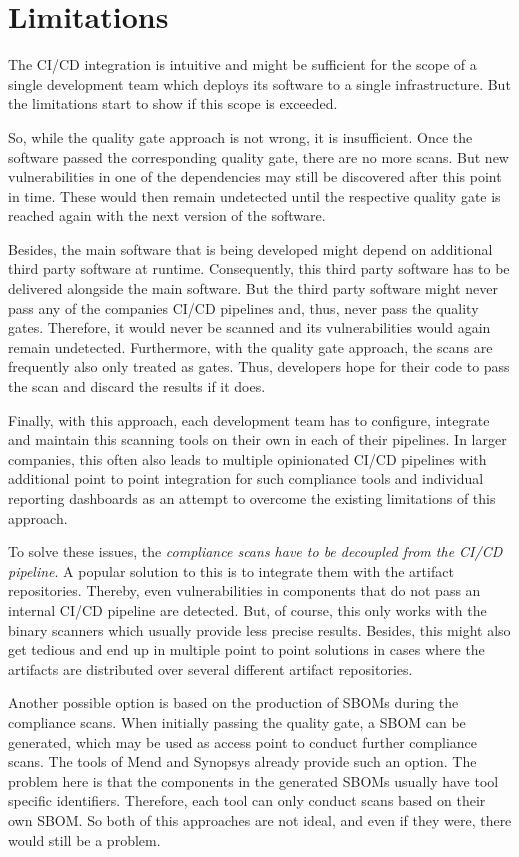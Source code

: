 \section{Limitations} \label{sec:Limitations}
The CI/CD integration is intuitive and might be sufficient for the scope of a single development team which deploys its software to a single infrastructure. But the limitations start to show if this scope is exceeded.\par
So, while the quality gate approach is not wrong, it is insufficient. Once the software passed the corresponding quality gate, there are no more scans. But new vulnerabilities in one of the dependencies may still be discovered after this point in time. These would then remain undetected until the respective quality gate is reached again with the next version of the software.\par
Besides, the main software that is being developed might depend on additional third party software at runtime. Consequently, this third party software has to be delivered alongside the main software. But the third party software might never pass any of the companies CI/CD pipelines and, thus, never pass the quality gates. Therefore, it would never be scanned and its vulnerabilities would again remain undetected. Furthermore, with the quality gate approach, the scans are frequently also only treated as gates. Thus, developers hope for their code to pass the scan and discard the results if it does.\par 
Finally, with this approach, each development team has to configure, integrate and maintain this scanning tools on their own in each of their pipelines. In larger companies, this often also leads to multiple opinionated CI/CD pipelines with additional point to point integration for such compliance tools and individual reporting dashboards as an attempt to overcome the existing limitations of this approach.\par
To solve these issues, the \textit{compliance scans have to be decoupled from the CI/CD pipeline}. A popular solution to this is to integrate them with the artifact repositories. Thereby, even vulnerabilities in components that do not pass an internal CI/CD pipeline are detected. But, of course, this only works with the binary scanners which usually provide less precise results. Besides, this might also get tedious and end up in multiple point to point solutions in cases where the artifacts are distributed over several different artifact repositories.\par 
Another possible option is based on the production of SBOMs during the compliance scans. When initially passing the quality gate, a SBOM can be generated, which may be used as access point to conduct further compliance scans. The tools of Mend and Synopsys already provide such an option. The problem here is that the components in the generated SBOMs usually have tool specific identifiers. Therefore, each tool can only conduct scans based on their own SBOM. So both of this approaches are not ideal, and even if they were, there would still be a problem.\par
